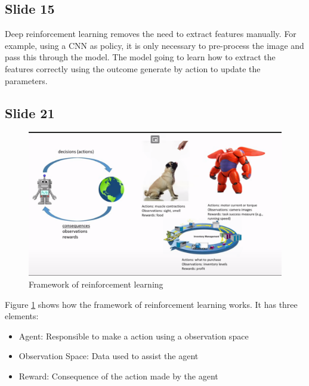 \documentclass{article}
\begin{document}
\subsection*{Slide 15}
\par Deep reinforcement learning removes the need to extract features manually. For example, using a CNN as policy, it
is only necessary to pre-process the image and pass this through the model. The model going to learn how to extract
the features correctly using the outcome generate by action to update the parameters.


\subsection*{Slide 21}

\begin{figure}
    \centering
    \includegraphics[scale=0.4]{cap1img/slide21.png}
    \caption{Framework of reinforcement learning}
    \label{fig:slide21}
\end{figure}

\par Figure \ref{fig:slide21} shows how the framework of reinforcement learning works. It has three elements:
\begin{itemize}
    \item Agent: Responsible to make a action using a observation space
    \item Observation Space: Data used to assist the agent
    \item Reward: Consequence of the action made by the agent
\end{itemize}
\end{document}
